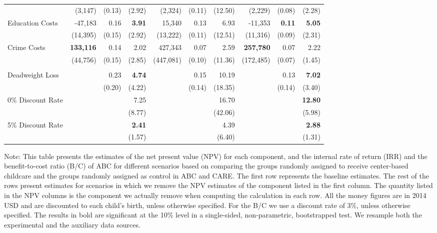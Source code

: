 \begin{table}
\begin{threeparttable}
\begin{tabular}{l r r r r r r r r r}
	&	(3,147)	&	(0.13)	&	(2.92)	&	(2,324)	&	(0.11)	&	(12.50)	&	(2,229)	&	(0.08)	&	(2.28)	\\
Education Costs	&	-47,183	&	0.16	&	\textbf{3.91}	&	15,340	&	0.13	&	6.93	&	-11,353	&	\textbf{0.11}	&	\textbf{5.05}	\\
	&	(14,395)	&	(0.15)	&	(2.92)	&	(13,222)	&	(0.11)	&	(12.51)	&	(11,316)	&	(0.09)	&	(2.31)	\\
Crime Costs	&	\textbf{133,116}	&	0.14	&	2.02	&	427,343	&	0.07	&	2.59	&	\textbf{257,780}	&	0.07	&	2.22	\\
	&	(44,756)	&	(0.15)	&	(2.85)	&	(447,081)	&	(0.10)	&	(11.36)	&	(172,485)	&	(0.07)	&	(1.45)	\\\\
Deadweight Loss	&		&	0.23	&	\textbf{4.74}	&		&	0.15	&	10.19	&		&	0.13	&	\textbf{7.02}	\\
	&		&	(0.20)	&	(4.22)	&		&	(0.14)	&	(18.35)	&		&	(0.14)	&	(3.40)	\\
0\% Discount Rate	&		&		&	7.25	&		&		&	16.70	&		&		&	\textbf{12.80}	\\
	&		&		&	(8.77)	&		&		&	(42.06)	&		&		&	(5.98)	\\
5\% Discount Rate	&		&		&	\textbf{2.41}	&		&		&	4.39	&		&		&	\textbf{2.88}	\\
	&		&		&	(1.57)	&		&		&	(6.40)	&		&		&	(1.31)	\\
\bottomrule
\end{tabular}
\begin{tablenotes}
\item Note: This table presents the estimates of the net present value (NPV) for each component, and the internal rate of return (IRR) and the benefit-to-cost ratio (B/C) of ABC for different scenarios based on comparing the groups randomly assigned to receive center-based childcare and the groups randomly assigned as control in ABC and CARE. The first row represents the baseline estimates. The rest of the rows present estimates for scenarios in which we remove the NPV estimates of the component listed in the first column. The quantity listed in the NPV columns is the component we actually remove when computing the calculation in each row. All the money figures are in 2014 USD and are discounted to each child's birth, unless otherwise specified. For the B/C we use a discount rate of $3\%$, unless otherwise specified. The results in bold are significant at the 10\% level in a single-sided, non-parametric, bootstrapped test. We resample both the experimental and the auxiliary data sources. 
\end{tablenotes}
\end{threeparttable}
\end{table}


